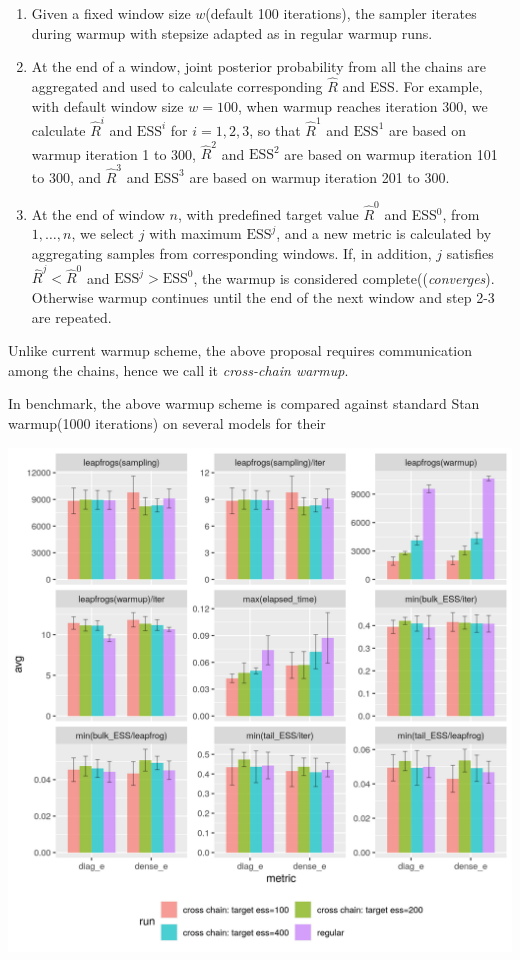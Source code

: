 \documentclass[landscape,a0paper,fontscale=0.5]{baposter} %
\newenvironment{ColFigure}
  {\par\medskip\noindent\minipage{\linewidth}}
  {\endminipage\par\medskip}
\begin{document}
\begin{poster}
{\begin{multicols}{2}
\begin{enumerate}
\item Given a fixed window size \(w\)(default 100 iterations), the sampler iterates during warmup with stepsize adapted as in regular warmup runs.
\item At the end of a window, joint posterior probability from all the
  chains are aggregated and used to calculate corresponding \(\hat{R}\) and ESS. 
For example, with default window size \(w=100\), when warmup reaches iteration 300, we calculate
\(\hat{R}^i\) and \(\text{ESS}^i\) for \(i=1, 2, 3\), so that
\(\hat{R}^1\) and \(\text{ESS}^1\) are based on warmup iteration 1 to 300,
\(\hat{R}^2\) and \(\text{ESS}^2\) are based on warmup iteration 101 to 300,
and
\(\hat{R}^3\) and \(\text{ESS}^3\) are based on warmup iteration 201 to 300.

\item At the end of window \(n\), with predefined target value
  \(\hat{R}^{0}\) and ESS\(^{0}\), from \({1, \dots, n}\),  we select
  \(j\) with maximum 
$\text{ESS}^j$,
and a new metric is calculated by aggregating samples from
corresponding windows.
If, in addition, \(j\) satisfies $\hat{R}^j < \hat{R}^0$ and $\text{ESS}^j > \text{ESS}^0$,
the warmup is considered complete((\emph{converges}). Otherwise warmup continues until
the end of the next window and step 2-3 are repeated.
\end{enumerate}
Unlike current warmup scheme, the above proposal requires
communication among the chains, hence we call it \emph{cross-chain warmup}.

In benchmark, the above warmup scheme is compared against standard Stan warmup(1000
iterations) on several models for their
\begin{ColFigure}
\centering
\includegraphics[width=0.8\linewidth]{./figure/cross_chain_ess_effect_eight_schools.png}
\end{ColFigure}


\end{multicols}}
\end{poster}
\end{document}

